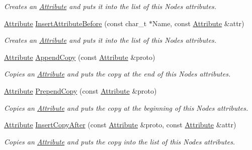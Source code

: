 \begin{DoxyCompactItemize}
\begin{DoxyCompactList}\small\item\em Creates an \hyperlink{classphys_1_1xml_1_1Attribute}{Attribute} and puts it into the list of this Nodes attributes. \item\end{DoxyCompactList}\item 
\hyperlink{classphys_1_1xml_1_1Attribute}{Attribute} \hyperlink{classphys_1_1xml_1_1Node_a0e4f1d13d8fb9c29068c01d8a0ac4217}{InsertAttributeBefore} (const char\_\-t $\ast$Name, const \hyperlink{classphys_1_1xml_1_1Attribute}{Attribute} \&attr)
\begin{DoxyCompactList}\small\item\em Creates an \hyperlink{classphys_1_1xml_1_1Attribute}{Attribute} and puts it into the list of this Nodes attributes. \item\end{DoxyCompactList}\item 
\hyperlink{classphys_1_1xml_1_1Attribute}{Attribute} \hyperlink{classphys_1_1xml_1_1Node_a33de8cdb7ed8694acac79aedc81523c9}{AppendCopy} (const \hyperlink{classphys_1_1xml_1_1Attribute}{Attribute} \&proto)
\begin{DoxyCompactList}\small\item\em Copies an \hyperlink{classphys_1_1xml_1_1Attribute}{Attribute} and puts the copy at the end of this Nodes attributes. \item\end{DoxyCompactList}\item 
\hyperlink{classphys_1_1xml_1_1Attribute}{Attribute} \hyperlink{classphys_1_1xml_1_1Node_ae5bd358ec34b0c49c6e8caea073bcde6}{PrependCopy} (const \hyperlink{classphys_1_1xml_1_1Attribute}{Attribute} \&proto)
\begin{DoxyCompactList}\small\item\em Copies an \hyperlink{classphys_1_1xml_1_1Attribute}{Attribute} and puts the copy at the beginning of this Nodes attributes. \item\end{DoxyCompactList}\item 
\hyperlink{classphys_1_1xml_1_1Attribute}{Attribute} \hyperlink{classphys_1_1xml_1_1Node_ae866210535227753bcd02aac8bac9e9e}{InsertCopyAfter} (const \hyperlink{classphys_1_1xml_1_1Attribute}{Attribute} \&proto, const \hyperlink{classphys_1_1xml_1_1Attribute}{Attribute} \&attr)
\begin{DoxyCompactList}\small\item\em Copies an \hyperlink{classphys_1_1xml_1_1Attribute}{Attribute} and puts the copy into the list of this Nodes attributes. \item\end{DoxyCompactList}\item 

\end{DoxyCompactItemize}
